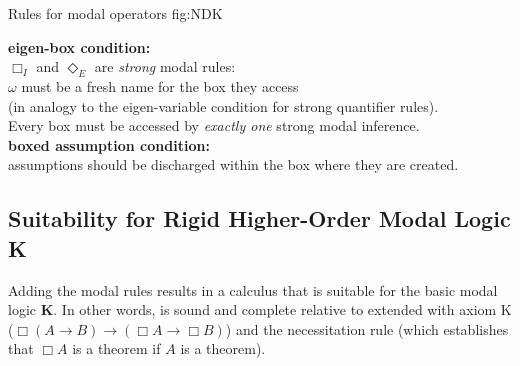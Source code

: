 \documentclass[smallextended]{svjour3}
\newcommand{\imp}{\rightarrow}
\newcommand{\nec}{\Box} %
\newcommand{\pos}{\Diamond} %
\begin{document}
\begin{calculus}
{Rules for modal operators}
{fig:NDK}

\vspace{1em}

\s\s\s\s\s\s
\infer[\nec_I]{\nec A}{\omega: \fbox{\infer*{A}{}} }
\s\s\s\s
\infer[\nec_E]{w: \fbox{ \infer*{}{A} } }{\nec A}

\vspace{2em}

\s\s\s\s\s\s
\infer[\pos_I]{\pos A}{w: \fbox{\infer*{A}{}} }
\s\s\s\s
\infer[\pos_E]{\omega: \fbox{ \infer*{}{A} } }{\pos A}

\vspace{1em}


\begin{center}
\textbf{eigen-box condition:}\\ 
$\nec_I$ and $\pos_E$ are \emph{strong} modal rules: \\
$\omega$ must be a fresh name for the box they access \\ 
(in analogy to the eigen-variable condition for strong quantifier rules). \\
Every box must be accessed by \emph{exactly one} strong modal inference. \\
\vspace{0.5em}
\textbf{boxed assumption condition:} \\
assumptions should be discharged within the box where they are created.
\end{center}

\vspace{1em}

\end{calculus}


\subsection{Suitability for Rigid Higher-Order Modal Logic K}\label{sec:compl-sound}

Adding the modal rules results in a calculus that is suitable for the basic modal logic \textbf{K}.
In other words, {\NDK} is sound and complete relative to {\ND} extended with axiom K ($\nec(A\imp B)\imp (\nec A\imp \nec B)$) and the necessitation rule (which establishes that $\nec A$ is a theorem if $A$ is a theorem).
\end{document}
